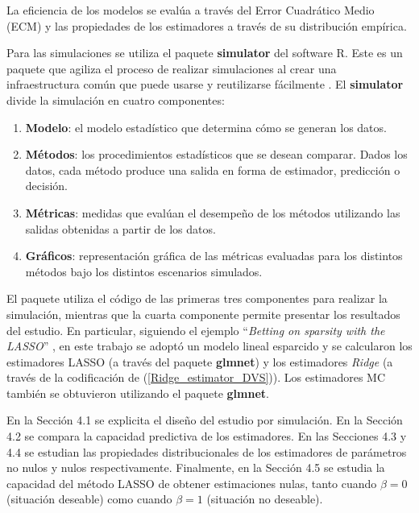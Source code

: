 \documentclass[a4paper,12pt]{report}
\begin{document}
La eficiencia de los modelos se evalúa a través del Error Cuadrático Medio (ECM) y las propiedades de los estimadores a través de su distribución empírica.

Para las simulaciones se utiliza el paquete \textbf{simulator} del software R. Este es un paquete que agiliza el proceso de realizar simulaciones al crear una infraestructura común que puede usarse y reutilizarse fácilmente \citep{bien2016simulator}. El \textbf{simulator} divide la simulación en cuatro componentes:
\begin{enumerate}
\item \textbf{Modelo}: el modelo estadístico que determina cómo se generan los datos.
\item \textbf{Métodos}: los procedimientos estadísticos que se desean comparar. Dados los datos, cada método produce una salida en forma de estimador, predicción o decisión.
\item \textbf{Métricas}: medidas que evalúan el desempeño de los métodos utilizando las salidas obtenidas a partir de los datos.
\item \textbf{Gráficos}: representación gráfica de las métricas evaluadas para los distintos métodos bajo los distintos escenarios simulados.
\end{enumerate}
El paquete utiliza el código de las primeras tres componentes para realizar la simulación, mientras que la cuarta componente permite presentar los resultados del estudio. En particular, siguiendo el ejemplo ``\textit{Betting on sparsity with the LASSO}'' \citep{bien2016simulator}, en este trabajo se adoptó un modelo lineal esparcido y se calcularon los estimadores LASSO (a través del paquete \textbf{glmnet}) y los estimadores \textit{Ridge} (a través de la codificación de (\ref{Ridge_estimator_DVS})). Los estimadores MC también se obtuvieron utilizando el paquete \textbf{glmnet}.

En la Sección 4.1 se explicita el diseño del estudio por simulación. En la Sección 4.2 se compara la capacidad predictiva de los estimadores. En las Secciones 4.3 y 4.4 se estudian las propiedades distribucionales de los estimadores de parámetros no nulos y nulos respectivamente. Finalmente, en la Sección 4.5 se estudia la capacidad del método LASSO de obtener estimaciones nulas, tanto cuando $\beta=0$ (situación deseable) como cuando $\beta=1$ (situación no deseable).
\end{document}
